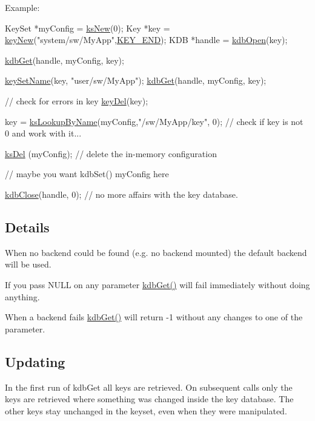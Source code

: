 \begin{DoxyParagraph}{Example\-:}

\begin{DoxyCode}
KeySet *myConfig = \hyperlink{group__keyset_ga671e1aaee3ae9dc13b4834a4ddbd2c3c}{ksNew}(0);
Key *key = \hyperlink{group__key_gaf6893c038b3ebee90c73a9ea8356bebf}{keyNew}(\textcolor{stringliteral}{"system/sw/MyApp"},\hyperlink{group__key_gga91fb3178848bd682000958089abbaf40aa8adb6fcb92dec58fb19410eacfdd403}{KEY\_END});
KDB *handle = \hyperlink{group__kdb_ga6808defe5870f328dd17910aacbdc6ca}{kdbOpen}(key);

\hyperlink{group__kdb_ga28e385fd9cb7ccfe0b2f1ed2f62453a1}{kdbGet}(handle, myConfig, key);

\hyperlink{group__keyname_ga7699091610e7f3f43d2949514a4b35d9}{keySetName}(key, \textcolor{stringliteral}{"user/sw/MyApp"});
\hyperlink{group__kdb_ga28e385fd9cb7ccfe0b2f1ed2f62453a1}{kdbGet}(handle, myConfig, key);

\textcolor{comment}{// check for errors in key}
\hyperlink{group__key_ga3df95bbc2494e3e6703ece5639be5bb1}{keyDel}(key);

key = \hyperlink{group__keyset_gad2e30fb6d4739d917c5abb2ac2f9c1a1}{ksLookupByName}(myConfig,\textcolor{stringliteral}{"/sw/MyApp/key"}, 0);
\textcolor{comment}{// check if key is not 0 and work with it...}

\hyperlink{group__keyset_ga27e5c16473b02a422238c8d970db7ac8}{ksDel} (myConfig); \textcolor{comment}{// delete the in-memory configuration}


\textcolor{comment}{// maybe you want kdbSet() myConfig here}

\hyperlink{group__kdb_gadb54dc9fda17ee07deb9444df745c96f}{kdbClose}(handle, 0); \textcolor{comment}{// no more affairs with the key database.}
\end{DoxyCode}

\end{DoxyParagraph}
\hypertarget{group__kdb_kdbgetdetail}{}\subsection{Details}\label{group__kdb_kdbgetdetail}
When no backend could be found (e.\-g. no backend mounted) the default backend will be used.

If you pass N\-U\-L\-L on any parameter \hyperlink{group__kdb_ga28e385fd9cb7ccfe0b2f1ed2f62453a1}{kdb\-Get()} will fail immediately without doing anything.

When a backend fails \hyperlink{group__kdb_ga28e385fd9cb7ccfe0b2f1ed2f62453a1}{kdb\-Get()} will return -\/1 without any changes to one of the parameter.\hypertarget{group__kdb_kdbgetupdate}{}\subsection{Updating}\label{group__kdb_kdbgetupdate}
In the first run of kdb\-Get all keys are retrieved. On subsequent calls only the keys are retrieved where something was changed inside the key database. The other keys stay unchanged in the keyset, even when they were manipulated.

